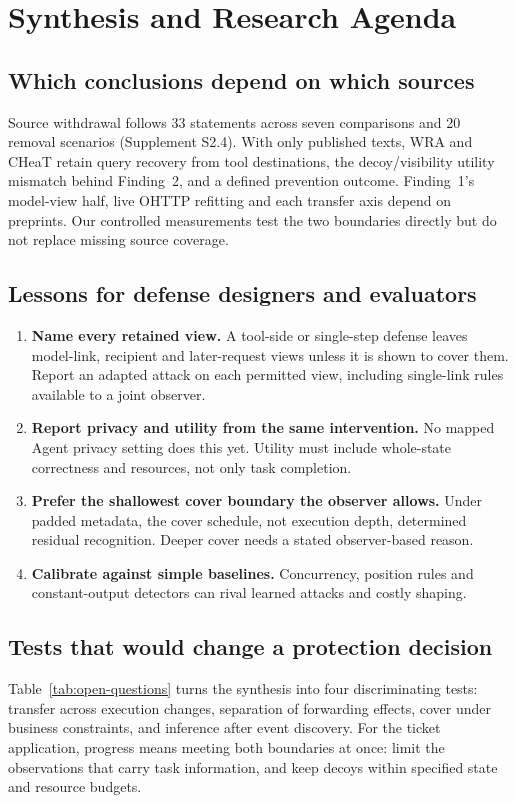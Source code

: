 \section{Synthesis and Research Agenda}\label{sec:agenda}
\subsection{Which conclusions depend on which sources}\label{sec:sensitivity}
Source withdrawal follows 33 statements across seven comparisons and 20 removal scenarios (Supplement S2.4). With only published texts, WRA and CHeaT retain query recovery from tool destinations, the decoy/visibility utility mismatch behind Finding~2, and a defined prevention outcome. Finding~1's model-view half, live OHTTP refitting and each transfer axis depend on preprints. Our controlled measurements test the two boundaries directly but do not replace missing source coverage.

\subsection{Lessons for defense designers and evaluators}
\begin{enumerate}
\item \textbf{Name every retained view.} A tool-side or single-step defense leaves model-link, recipient and later-request views unless it is shown to cover them. Report an adapted attack on each permitted view, including single-link rules available to a joint observer.
\item \textbf{Report privacy and utility from the same intervention.} No mapped Agent privacy setting does this yet. Utility must include whole-state correctness and resources, not only task completion.
\item \textbf{Prefer the shallowest cover boundary the observer allows.} Under padded metadata, the cover schedule, not execution depth, determined residual recognition. Deeper cover needs a stated observer-based reason.
\item \textbf{Calibrate against simple baselines.} Concurrency, position rules and constant-output detectors can rival learned attacks and costly shaping.
\end{enumerate}

\subsection{Tests that would change a protection decision}
Table~\ref{tab:open-questions} turns the synthesis into four discriminating tests: transfer across execution changes, separation of forwarding effects, cover under business constraints, and inference after event discovery. For the ticket application, progress means meeting both boundaries at once: limit the observations that carry task information, and keep decoys within specified state and resource budgets.

